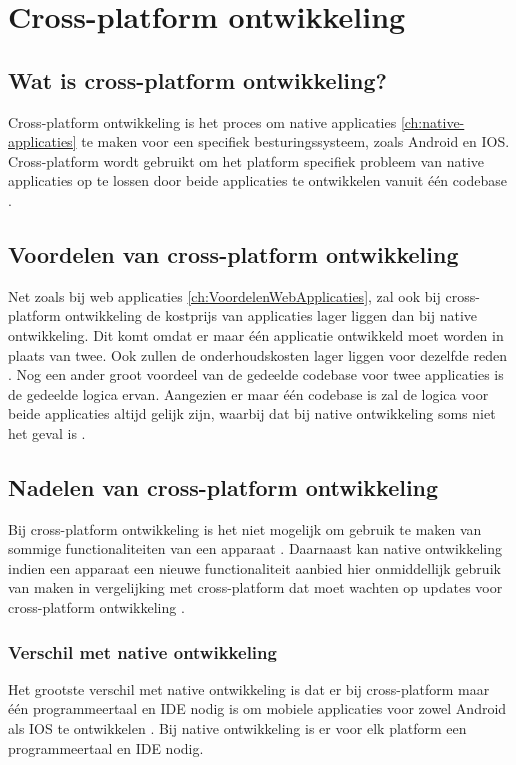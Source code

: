 \section{Cross-platform ontwikkeling}
\subsection{Wat is cross-platform ontwikkeling?}
Cross-platform ontwikkeling is het proces om native applicaties \ref{ch:native-applicaties} 
te maken voor een specifiek besturingssysteem, zoals Android en IOS. Cross-platform wordt 
gebruikt om het platform specifiek probleem van native applicaties op te lossen door beide 
applicaties te ontwikkelen vanuit één codebase \autocite{Khan2021}.

\subsection{Voordelen van cross-platform ontwikkeling}
Net zoals bij web applicaties \ref{ch:VoordelenWebApplicaties}, zal ook bij cross-platform 
ontwikkeling de kostprijs van applicaties lager liggen dan bij native ontwikkeling. 
Dit komt omdat er maar één applicatie ontwikkeld moet worden in plaats van twee. Ook zullen de 
onderhoudskosten lager liggen voor dezelfde reden \autocite{Terekhov2022}. Nog een ander 
groot voordeel van de gedeelde codebase voor twee applicaties is de gedeelde logica ervan. 
Aangezien er maar één codebase is zal de logica voor beide applicaties altijd gelijk zijn, waarbij 
dat bij native ontwikkeling soms niet het geval is \autocite{Kotlin2023}.

\subsection{Nadelen van cross-platform ontwikkeling}
Bij cross-platform ontwikkeling is het niet mogelijk om gebruik te maken van sommige 
functionaliteiten van een apparaat \autocite{Terekhov2022}. Daarnaast kan native 
ontwikkeling indien een apparaat een nieuwe functionaliteit aanbied hier onmiddellijk gebruik 
van maken in vergelijking met cross-platform dat moet wachten op updates voor cross-platform 
ontwikkeling \autocite{Sakovich22023}.

\subsubsection{Verschil met native ontwikkeling}
Het grootste verschil met native ontwikkeling is dat er bij cross-platform maar één 
programmeertaal en IDE nodig is om mobiele applicaties voor zowel Android als IOS te 
ontwikkelen \autocite{Hu2021}. Bij native ontwikkeling is er voor elk platform een 
programmeertaal en IDE nodig. 

